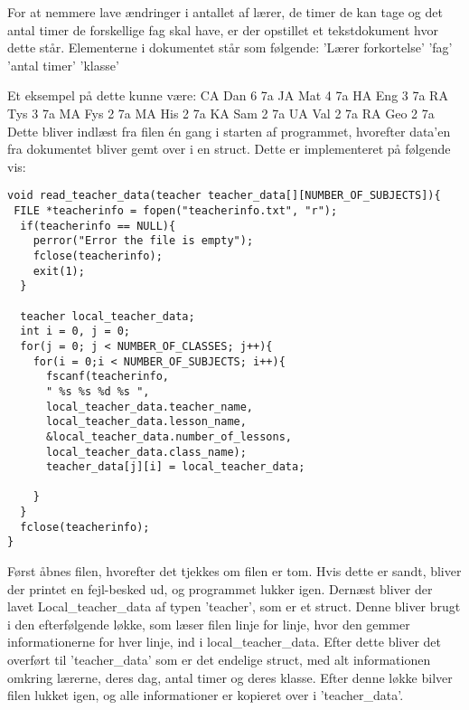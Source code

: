 For at nemmere lave ændringer i antallet af lærer, de timer de kan tage og det antal timer de forskellige fag skal have, er der opstillet et tekstdokument hvor dette står. 
Elementerne i dokumentet står som følgende:
’Lærer forkortelse’ ’fag’ ’antal timer’ ’klasse’

Et eksempel på dette kunne være:
    CA Dan 6 7a
    JA Mat 4 7a
    HA Eng 3 7a
    RA Tys 3 7a
    MA Fys 2 7a
    MA His 2 7a
    KA Sam 2 7a
    UA Val 2 7a
    RA Geo 2 7a
Dette bliver indlæst fra filen én gang i starten af programmet, hvorefter data’en fra dokumentet bliver gemt over i en struct.
Dette er implementeret på følgende vis:
\begin{lstlisting}
void read_teacher_data(teacher teacher_data[][NUMBER_OF_SUBJECTS]){
 FILE *teacherinfo = fopen("teacherinfo.txt", "r");
  if(teacherinfo == NULL){
    perror("Error the file is empty");
    fclose(teacherinfo);
    exit(1);
  }

  teacher local_teacher_data;
  int i = 0, j = 0;
  for(j = 0; j < NUMBER_OF_CLASSES; j++){
    for(i = 0;i < NUMBER_OF_SUBJECTS; i++){
      fscanf(teacherinfo,
      " %s %s %d %s ",
      local_teacher_data.teacher_name, 
      local_teacher_data.lesson_name, 
      &local_teacher_data.number_of_lessons, 
      local_teacher_data.class_name);
      teacher_data[j][i] = local_teacher_data; 
  
    } 
  }  
  fclose(teacherinfo);
}
\end{lstlisting}
Først åbnes filen, hvorefter det tjekkes om filen er tom. Hvis dette er sandt, bliver der printet en fejl-besked ud, og programmet lukker igen.
Dernæst bliver der lavet Local\_teacher\_data af typen ’teacher’, som er et struct. Denne bliver brugt i den efterfølgende løkke, som læser filen linje for linje, hvor den gemmer informationerne for hver linje, ind i local\_teacher\_data. Efter dette bliver det overført til ’teacher\_data’ som er det endelige struct, med alt informationen omkring lærerne, deres dag, antal timer og deres klasse. 
Efter denne løkke bilver filen lukket igen, og alle informationer er kopieret over i ’teacher\_data’.